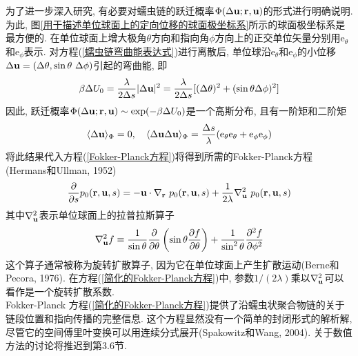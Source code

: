 为了进一步深入研究, 有必要对蠕虫链的跃迁概率$\Phi(\Delta \mathbf{u};\mathbf{r},\mathbf{u})$的形式进行明确说明. 为此, 图\ref{用于描述单位球面上的定向位移的球面极坐标系}所示的球面极坐标系是最方便的. 在单位球面上增大极角$\theta$方向和指向角$\phi$方向上的正交单位矢量分别用$\mathrm{e}_\theta$和$\mathrm{e}_\phi$表示. 对方程(\ref{蠕虫链弯曲能表达式})进行离散后, 单位球沿$\mathrm{e}_\theta$和$\mathrm{e}_\phi$的小位移$\Delta \mathbf{u}=(\Delta \theta ,\sin \theta \ \Delta \phi)$引起的弯曲能, 即\\
\begin{equation}
\beta\Delta U_0 =\frac{\lambda}{2\Delta s}|\Delta \mathbf{u}|^2 =\frac{\lambda}{2\Delta s}[(\Delta\theta)^2+(\sin \theta \Delta \phi)^2]
\end{equation}
因此, 跃迁概率$\Phi(\Delta \mathbf{u};\mathbf{r},\mathbf{u})\sim 
\exp(-\beta \Delta U_0)$是一个高斯分布, 且有一阶矩和二阶矩\\
\begin{equation}
\langle \Delta \mathbf{u}\rangle_\Phi =0,\quad \langle \Delta \mathbf{u}\Delta \mathbf{u}\rangle_\Phi =\frac{\Delta s}{\lambda}(\mathrm{e}_\theta \mathrm{e}_\theta+\mathrm{e}_\phi \mathrm{e}_\phi)
\end{equation}
将此结果代入方程(\ref{Fokker-Planck方程})将得到所需的Fokker-Planck方程(Hermans和Ullman, 1952)\\
\begin{equation}
	\frac{\partial}{\partial s}p_0(\br,\bu,s) =-\bu \cdot \nabla_{\br} \ p_0(\br,\bu,s)+\frac{1}{2\lambda}\nabla_{\bu}^2\  p_0(\br,\bu,s)\label{简化的Fokker-Planck方程}
\end{equation}
其中$\nabla_{\mathbf{u}}^2$表示单位球面上的拉普拉斯算子\\
\begin{equation}
\nabla_{\mathbf{u}}^2 f \equiv \frac{1}{\sin\theta}\frac{\partial}{\partial\theta}\left(\sin\theta \frac{\partial f}{\partial \theta}\right)+\frac{1}{\sin^2\theta}\frac{\partial^2f}{\partial\phi^2}
\end{equation}
这个算子通常被称为旋转扩散算子, 因为它在单位球面上产生扩散运动(Berne和Pecora, 1976). 在方程(\ref{简化的Fokker-Planck方程})中, 参数$1/(2\lambda)$乘以$\nabla_{\mathbf{u}}^2$可以看作是一个旋转扩散系数. \\

Fokker-Planck 方程(\ref{简化的Fokker-Planck方程})提供了沿蠕虫状聚合物链的关于链段位置和指向传播的完整信息. 这个方程显然没有一个简单的封闭形式的解析解, 尽管它的空间傅里叶变换可以用连续分式展开(Spakowitz和Wang, 2004). 关于数值方法的讨论将推迟到第3.6节. \\

